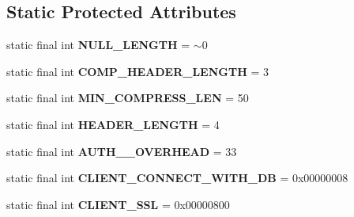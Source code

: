 \subsection*{Static Protected Attributes}
\begin{DoxyCompactItemize}
\item 
\mbox{\label{classcom_1_1mysql_1_1jdbc_1_1_mysql_i_o_acbf9702f62d3a30f500e3472721e592a}} 
static final int {\bfseries N\+U\+L\+L\+\_\+\+L\+E\+N\+G\+TH} = $\sim$0
\item 
\mbox{\label{classcom_1_1mysql_1_1jdbc_1_1_mysql_i_o_a21c11a84b28aab8401f8d95a18262a2a}} 
static final int {\bfseries C\+O\+M\+P\+\_\+\+H\+E\+A\+D\+E\+R\+\_\+\+L\+E\+N\+G\+TH} = 3
\item 
\mbox{\label{classcom_1_1mysql_1_1jdbc_1_1_mysql_i_o_aa0debc972775b27b9dc716d091d3e6d0}} 
static final int {\bfseries M\+I\+N\+\_\+\+C\+O\+M\+P\+R\+E\+S\+S\+\_\+\+L\+EN} = 50
\item 
\mbox{\label{classcom_1_1mysql_1_1jdbc_1_1_mysql_i_o_a5d4fa493dff3be862dcad4b53ace80cb}} 
static final int {\bfseries H\+E\+A\+D\+E\+R\+\_\+\+L\+E\+N\+G\+TH} = 4
\item 
\mbox{\label{classcom_1_1mysql_1_1jdbc_1_1_mysql_i_o_a22aaf479178d9af21c550d9cd1f92c09}} 
static final int {\bfseries A\+U\+T\+H\+\_\+\_\+\+O\+V\+E\+R\+H\+E\+AD} = 33
\item 
\mbox{\label{classcom_1_1mysql_1_1jdbc_1_1_mysql_i_o_ac7036ef3f597d74f66db70f2aa0d2bf8}} 
static final int {\bfseries C\+L\+I\+E\+N\+T\+\_\+\+C\+O\+N\+N\+E\+C\+T\+\_\+\+W\+I\+T\+H\+\_\+\+DB} = 0x00000008
\item 
\mbox{\label{classcom_1_1mysql_1_1jdbc_1_1_mysql_i_o_a299288664939debd64d3313f2488a242}} 
static final int {\bfseries C\+L\+I\+E\+N\+T\+\_\+\+S\+SL} = 0x00000800
\item 
\mbox{\label{classcom_1_1mysql_1_1jdbc_1_1_mysql_i_o_af34b097a95dcae67cd9c3dff0aae2060}} 

\end{DoxyCompactItemize}
